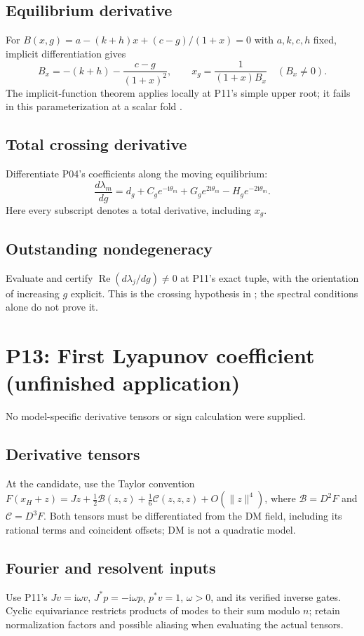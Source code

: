 \documentclass[11pt]{article}
\newcommand{\ii}{\mathrm{i}}
\DeclareMathOperator{\Ree}{Re}
\theoremstyle{definition}
\theoremstyle{remark}
\begin{document}
\subsection{Equilibrium derivative}\label{slot:P12-1}
For $B(x,g)=a-(k+h)x+(c-g)/(1+x)=0$ with $a,k,c,h$ fixed,
implicit differentiation gives
\[
 B_x=-(k+h)-\frac{c-g}{(1+x)^2},\qquad
 x_g=\frac{1}{(1+x)B_x}\quad(B_x\ne0).
\]
The implicit-function theorem applies locally at P11's simple upper root;
it fails in this parameterization at a scalar fold
\cite[Ch.~1]{GuckenheimerHolmes1983}.
\subsection{Total crossing derivative}\label{slot:P12-2}
Differentiate P04's coefficients along the moving equilibrium:
\[
 \frac{d\lambda_m}{dg}
 =d_g+C_g e^{-\ii\theta_m}+G_g e^{2\ii\theta_m}-H_g e^{-2\ii\theta_m}.
\]
Here every subscript denotes a total derivative, including $x_g$.
\subsection{Outstanding nondegeneracy}\label{slot:P12-3}
Evaluate and certify $\Ree(d\lambda_j/dg)\ne0$ at P11's exact tuple,
with the orientation of increasing $g$ explicit. This is the crossing
hypothesis in \cite{KuznetsovHopf2006}; the spectral conditions alone
do not prove it.


\section{P13: First Lyapunov coefficient (unfinished application)}
\label{sec:P13}
No model-specific derivative tensors or sign calculation were supplied.
\subsection{Derivative tensors}\label{slot:P13-1}
At the candidate, use the Taylor convention
$F(x_H+z)=Jz+\frac12\mathcal B(z,z)+\frac16\mathcal C(z,z,z)+O(\|z\|^4)$,
where $\mathcal B=D^2F$ and $\mathcal C=D^3F$.
Both tensors must be differentiated from the DM field, including its
rational terms and coincident offsets; DM is not a quadratic model.
\subsection{Fourier and resolvent inputs}\label{slot:P13-2}
Use P11's $Jv=\ii\omega v$, $J^*p=-\ii\omega p$, $p^*v=1$,
$\omega>0$, and its verified inverse gates. Cyclic equivariance restricts
products of modes to their sum modulo $n$; retain normalization factors
and possible aliasing when evaluating the actual tensors.
\end{document}
